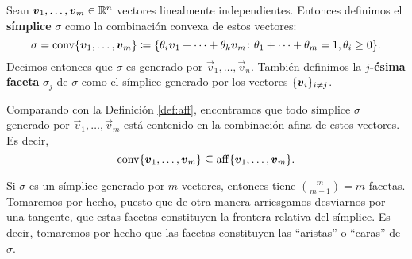 \begin{definition}
	\label{def:simplex}
	Sean $\boldsymbol{v}_1, \ldots, \boldsymbol{v}_m \in \mathbb{R}^n$ vectores linealmente independientes. Entonces
	definimos el \textbf{símplice} $\sigma$ como la combinación convexa de estos vectores:
	\begin{equation*}
		\sigma = \operatorname{conv}\lbrace \boldsymbol{v}_1, \ldots, \boldsymbol{v}_m \rbrace
		\coloneq
		\lbrace \theta_i\boldsymbol{v}_1 + \cdots + \theta_k\boldsymbol{v}_m
		\colon \theta_1 + \cdots + \theta_m = 1, \theta_i \geq 0 \rbrace.
	\end{equation*}
	Decimos entonces que $\sigma$ es generado por $\vec{v}_1, \ldots, \vec{v}_n$. También definimos
	la \textbf{$j$-ésima faceta} $\sigma_j$ de $\sigma$ como el símplice generado por los vectores
	$\lbrace \boldsymbol{v}_i \rbrace_{i \neq j}$.
\end{definition}
\begin{observation}
	Comparando con la Definición \ref{def:aff}, encontramos que todo símplice $\sigma$ generado por
	$\vec{v}_1, \ldots, \vec{v}_m$ está contenido en la combinación afina de estos vectores. Es
	decir,
	\begin{equation}
		\label{aff:contention}
		\operatorname{conv}\lbrace \boldsymbol{v}_1, \ldots, \boldsymbol{v}_m \rbrace \subseteq
		\operatorname{aff}\lbrace \boldsymbol{v}_1, \ldots, \boldsymbol{v}_m \rbrace.
	\end{equation}
\end{observation}
\begin{observation}
	Si $\sigma$ es un símplice generado por $m$ vectores, entonces tiene $\binom{m}{m-1} = m$
	facetas. Tomaremos por hecho, puesto que de otra manera arriesgamos desviarnos por una tangente,
	que estas facetas constituyen la frontera relativa del símplice. Es decir, tomaremos por hecho
	que las facetas constituyen las ``aristas'' o ``caras'' de $\sigma$.
\end{observation}


